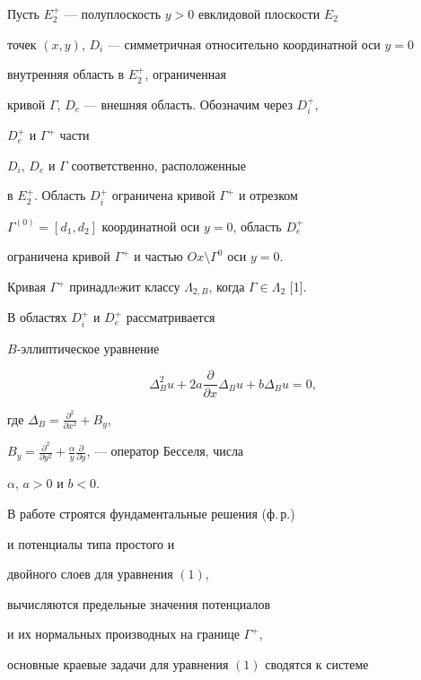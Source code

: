 Пусть $E_{2}^{+}$ --- полуплоскость $y>0$ евклидовой плоскости $E_{2}$


точек $(x,y)$, $D_{i}$ --- симметричная относительно координатной оси $y=0$ 


внутренняя область в $E_{2}^{+}$, ограниченная


кривой $\Gamma$, $D_{e}$ --- внешняя область. Обозначим через $D_{i}^{+}$, 


$D_{e}^{+}$ и $\Gamma^{+}$ части


$D_{i}$, $D_{e}$ и $\Gamma$ соответственно, расположенные


в $E_{2}^{+}$. Область $D_{i}^{+}$ ограничена кривой $\Gamma^{+}$ и отрезком 


$\Gamma^{(0)}=[d_{1},d_{2}]$ координатной оси $y=0$, область $D_{e}^{+}$ 


ограничена кривой $\Gamma^{+}$ и частью $Ox\setminus \Gamma^{0}$ оси $y=0$.


Кривая $\Gamma^{+}$  принадлeжит классу $\Lambda_{2,B}$, когда $\Gamma\in


\Lambda_{2}$ [1].





В областях $D_{i}^{+}$  и $D_{e}^{+}$ рассматривается


$B$-эллиптическое уравнение


\begin{equation}


\Delta_{B}^{2}u+2a\frac{\partial}{\partial x}\Delta_{B}u+b\Delta_{B}u=0,


\end{equation}


где $\Delta_{B}=\frac{\partial^{2}}{\partial x^{2}}+B_{y}$,


$B_{y}=\frac{\partial^{2}}{\partial y^{2}}+


\frac{\alpha}{y}\frac{\partial}{\partial y}$, --- оператор Бесселя, числа


$\alpha$, $a>0$ и $b<0$.





В работе строятся фундаментальные решения (ф.\,р.)


и потенциалы типа простого и 


двойного слоев для уравнения $(1)$, 


вычисляются предельные значения потенциалов


и их нормальных производных на границе $\Gamma^{+}$, 


основные краевые задачи для уравнения $(1)$ сводятся к системе 


